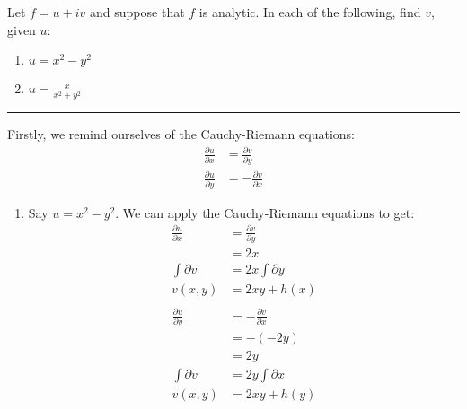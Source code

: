 \begin{example}

    Let $f = u+iv$ and suppose that $f$ is analytic. In each of the following, find $v$, given $u$:
    \begin{enumerate}
        \item $u = x^2-y^2$
        \item $u = \frac{x}{x^2+y^2}$
    \end{enumerate}

    \hrule
    \vspace{0.5cm}

    Firstly, we remind ourselves of the Cauchy-Riemann equations:
    \begin{align*}
        \frac{\partial u}{\partial x} & = \frac{\partial v}{\partial y}  \\
        \frac{\partial u}{\partial y} & = -\frac{\partial v}{\partial x}
    \end{align*}
    \begin{enumerate}
        \item Say $u = x^2-y^2$. We can apply the Cauchy-Riemann equations to get:
              \begin{align*}
                  \frac{\partial u}{\partial x} & = \frac{\partial v}{\partial y} \\
                                                & = 2x                            \\
                  \int \partial v               & = 2x \int \partial y            \\
                  v (x,y)                       & = 2xy + h(x)                    \\
              \end{align*}
              \begin{align*}
                  \frac{\partial u}{\partial y} & = -\frac{\partial v}{\partial x} \\
                                                & = -(-2y)                         \\
                                                & = 2y                             \\
                  \int \partial v               & = 2y \int \partial x             \\
                  v (x,y)                       & = 2xy + h(y)                     \\
              \end{align*}


\end{enumerate}
\end{example}
